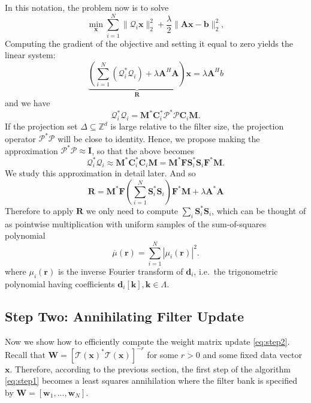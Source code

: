 \documentclass[10pt, twocolumn, twoside]{IEEEtran}
\newcommand{\mbf}{\mathbf}
\begin{document}
In this notation, the problem now is to solve
\[
\min_{\mbf x} \sum_{i=1}^N\|\mathcal{Q}_i \mbf x\|_2^2 + \frac{\lambda}{2}\|\mbf A \mbf x - \mathbf b\|_2^2,
\]
Computing the gradient of the objective and setting it equal to zero yields the linear system:
\[
\underbrace{\left(\sum_{i=1}^N (\mathcal{Q}_i^*\mathcal{Q}_i)  + \lambda \mbf A^H\mbf A \right )}_{\mathbf R} \mbf x = \lambda \mbf A^H b
\]
and we have 
\[
 \mathcal{Q}_i^*\mathcal{Q}_i  = \mathbf M^* \mathbf C_i^* \mathcal{P}^*\mathcal{P} \mathbf C_i \mathbf M.
\]
If the projection set $\Delta \subseteq \mathbb{Z}^d$ is large relative to the filter size, the projection operator $\mathcal{P}^*\mathcal{P}$ will be close to identity. Hence, we propose making the approximation $\mathcal{P}^*\mathcal{P} \approx \mathbf I$, so that the above becomes 
\[
 \mathcal{Q}_i^*\mathcal{Q}_i  \approx \mathbf M^* \mathbf C_i^* \mathbf C_i \mathbf M = \mathbf M^* \mathbf F \mbf S_i^* \mbf S_i \mathbf F^*\mathbf M.
\]
We study this approximation in detail later.
And so 
\[
\mathbf R = \mathbf M^* \mathbf F \left(\sum_{i=1}^N \mbf S_i^*\mbf S_i\right) \mathbf F^* \mathbf M + \lambda \mbf A^* \mbf A
\]
Therefore to apply $\mathbf R$ we only need to compute $\sum_i \mbf S_i^* \mbf S_i$, which can be thought of as pointwise multiplication with uniform samples of the sum-of-squares polynomial
\begin{equation}
\label{eq:sumofsquares}
\overline{\mu}(\mathbf r) = \sum_{i=1}^N |\mu_i(\mathbf r)|^2.
\end{equation}
where $\mu_i(\mathbf r)$ is the inverse Fourier transform of $\mathbf d_i$, i.e.\ the trigonometric polynomial having coefficients $\mathbf d_i[\mathbf k], \mathbf k \in \Lambda$.
\subsection{Step Two: Annihilating Filter Update}
Now we show how to efficiently compute the weight matrix update \eqref{eq:step2}. Recall that $\mathbf W = [\mathcal{T}(\mbf x)^* \mathcal{T}(\mbf x)]^{-r}$ for some $r>0$ and some fixed data vector $\mbf x$. Therefore, according to the previous section, the first step of the algorithm \eqref{eq:step1} becomes a least squares annihilation where the filter bank is specified by $\mathbf W = [\mathbf w_1,..., \mathbf w_N]$.
\end{document}
